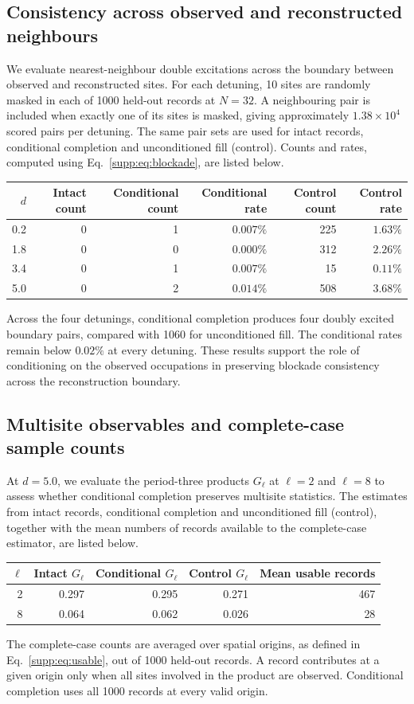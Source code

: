 \documentclass[11pt,a4paper]{article}
\newcommand{\subhead}[1]{\subsection*{#1}}
\begin{document}
\subhead{Consistency across observed and reconstructed neighbours}
We evaluate nearest-neighbour double excitations across the boundary
between observed and reconstructed sites. For each detuning, 10 sites
are randomly masked in each of 1000 held-out records at $N=32$.
A neighbouring pair is included when exactly one of its sites is
masked, giving approximately $1.38\times10^4$ scored pairs per
detuning. The same pair sets are used for intact records, conditional
completion and unconditioned fill (control). Counts and rates,
computed using Eq.~\eqref{supp:eq:blockade}, are listed below.
\begin{center}
\small
\begin{tabular}{@{}r r r r r r@{}}
\toprule
$d$ & Intact count & Conditional count & Conditional rate
& Control count & Control rate\\
\midrule
0.2 & 0 & 1 & $0.007\%$ & 225 & $1.63\%$\\
1.8 & 0 & 0 & $0.000\%$ & 312 & $2.26\%$\\
3.4 & 0 & 1 & $0.007\%$ & 15 & $0.11\%$\\
5.0 & 0 & 2 & $0.014\%$ & 508 & $3.68\%$\\
\bottomrule
\end{tabular}
\end{center}
Across the four detunings, conditional completion produces four
doubly excited boundary pairs, compared with 1060 for unconditioned
fill. The conditional rates remain below $0.02\%$ at every detuning.
These results support the role of conditioning on the observed
occupations in preserving blockade consistency across the
reconstruction boundary.

\subhead{Multisite observables and complete-case sample counts}
At $d=5.0$, we evaluate the period-three products $G_\ell$ at
$\ell=2$ and $\ell=8$ to assess whether conditional completion
preserves multisite statistics. The estimates from intact records,
conditional completion and unconditioned fill (control), together
with the mean numbers of records available to the complete-case
estimator, are listed below.
\begin{center}
\begin{tabular}{@{}r r r r r@{}}
\toprule
$\ell$ & Intact $G_\ell$ & Conditional $G_\ell$ & Control $G_\ell$
& Mean usable records\\
\midrule
2 & 0.297 & 0.295 & 0.271 & 467\\
8 & 0.064 & 0.062 & 0.026 & 28\\
\bottomrule
\end{tabular}
\end{center}
The complete-case counts are averaged over spatial origins, as
defined in Eq.~\eqref{supp:eq:usable}, out of 1000 held-out records.
A record contributes at a given origin only when all sites involved
in the product are observed. Conditional completion uses all 1000
records at every valid origin.
\end{document}

